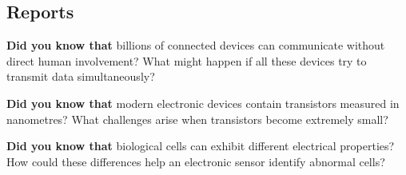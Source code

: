 \thispagestyle{empty}
\vspace*{\fill}
\begin{center}
    \section*{\normalfont\fontsize{60}{72}\selectfont\cursive Reports}
\end{center}
\vspace*{\fill}

\newpage

\thispagestyle{empty}
\null
\newpage




\begin{center}
\begin{tcolorbox}[colback=SoftYellow, colframe=IEEEblue!70!black, boxrule=0.5pt, arc=0mm, left=3mm, right=3mm, top=1mm, bottom=1mm, width=0.92\textwidth]
\small\RaggedRight \textbf{\color{IEEEblue!75!black}Did you know that} billions of connected devices can communicate without direct human involvement? What might happen if all these devices try to transmit data simultaneously?
\end{tcolorbox}
\end{center}

\clearpage



\begin{center}
\begin{tcolorbox}[colback=SoftYellow, colframe=IEEEblue!70!black, boxrule=0.5pt, arc=0mm, left=3mm, right=3mm, top=1mm, bottom=1mm, width=0.92\textwidth]
\small\RaggedRight \textbf{\color{IEEEblue!75!black}Did you know that} modern electronic devices contain transistors measured in nanometres? What challenges arise when transistors become extremely small?
\end{tcolorbox}
\end{center}

\clearpage



\begin{center}
\begin{tcolorbox}[colback=SoftYellow, colframe=IEEEblue!70!black, boxrule=0.5pt, arc=0mm, left=3mm, right=3mm, top=1mm, bottom=1mm, width=0.92\textwidth]
\small\RaggedRight \textbf{\color{IEEEblue!75!black}Did you know that} biological cells can exhibit different electrical properties? How could these differences help an electronic sensor identify abnormal cells?
\end{tcolorbox}
\end{center}

